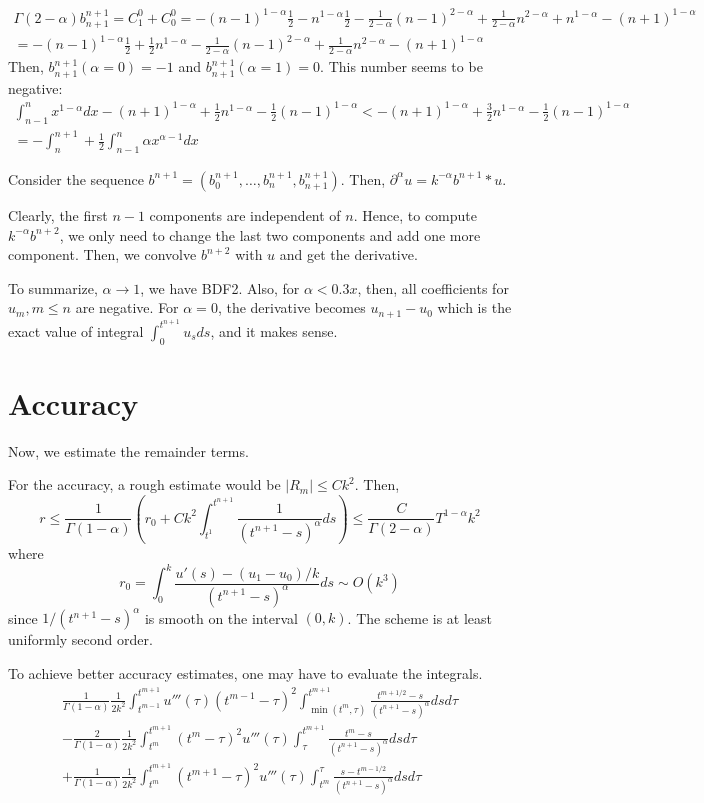 \documentclass[11pt]{article}
\begin{document}
   
\begin{multline*}
\Gamma(2-\alpha)b_{n+1}^{n+1}=C_1^0+C_0^0=
-(n-1)^{1-\alpha}\frac{1}{2}-n^{1-\alpha}\frac{1}{2}
-\frac{1}{2-\alpha}(n-1)^{2-\alpha}+\frac{1}{2-\alpha}n^{2-\alpha}
+n^{1-\alpha}-(n+1)^{1-\alpha}\\
=-(n-1)^{1-\alpha}\frac{1}{2}+\frac{1}{2}n^{1-\alpha}
-\frac{1}{2-\alpha}(n-1)^{2-\alpha}+\frac{1}{2-\alpha}n^{2-\alpha}
-(n+1)^{1-\alpha}
\end{multline*}
Then, $b_{n+1}^{n+1}(\alpha=0)=-1$ and $b_{n+1}^{n+1}(\alpha=1)=0$. This number seems to be negative: 
\begin{multline*}
\int_{n-1}^nx^{1-\alpha}dx-(n+1)^{1-\alpha}+\frac{1}{2}n^{1-\alpha}
-\frac{1}{2}(n-1)^{1-\alpha}
<-(n+1)^{1-\alpha}+\frac{3}{2}n^{1-\alpha}-\frac{1}{2}(n-1)^{1-\alpha}\\
=-\int_n^{n+1}+\frac{1}{2}\int_{n-1}^n\alpha x^{\alpha-1}dx
\end{multline*}

Consider the sequence $b^{n+1}=(b_0^{n+1}, \ldots, b_n^{n+1}, b_{n+1}^{n+1})$. Then, $\partial^{\alpha}u=k^{-\alpha}b^{n+1}*u$.

Clearly, the first $n-1$ components are independent of $n$. Hence, to compute $k^{-\alpha}b^{n+2}$, we only need to change the last two components and add one more component. Then, we convolve $b^{n+2}$ with $u$ and get the derivative.

To summarize, $\alpha\to 1$, we have BDF2. Also, for $\alpha<0.3x$, then, all coefficients for $u_m, m\le n$ are negative. 
For $\alpha=0$, the derivative becomes $u_{n+1}-u_0$ which is the exact value of integral $\int_0^{t^{n+1}}u_s ds$, and it makes sense.

\section{Accuracy}
Now, we estimate the remainder terms.

For the accuracy, a rough estimate would be $|R_m|\le Ck^2$. Then, $$
r\le \frac{1}{\Gamma(1-\alpha)}(r_0+Ck^2\int_{t^1}^{t^{n+1}}\frac{1}{(t^{n+1}-s)^{\alpha}}ds)\le \frac{C}{\Gamma(2-\alpha)}T^{1-\alpha}k^2
$$
where $$
r_0=\int_0^k\frac{u'(s)-(u_1-u_0)/k}{(t^{n+1}-s)^{\alpha}}ds
\sim 
O(k^3)
$$
since $1/(t^{n+1}-s)^{\alpha}$ is smooth on the interval $(0, k)$.
The scheme is at least uniformly second order.

To achieve better accuracy estimates, one may have to evaluate the integrals. 
\begin{multline*}
\frac{1}{\Gamma(1-\alpha)}\frac{1}{2k^2}\int_{t^{m-1}}^{t^{m+1}}
u'''(\tau)(t^{m-1}-\tau)^2\int_{\min(t^m,\tau)}^{t^{m+1}}\frac{t^{m+1/2}-s}{(t^{n+1}-s)^{\alpha}}dsd\tau\\
-\frac{2}{\Gamma(1-\alpha)}\frac{1}{2k^2}\int_{t^m}^{t^{m+1}}
(t^m-\tau)^2u'''(\tau)\int_{\tau}^{t^{m+1}}\frac{t^{m}-s}{(t^{n+1}-s)^{\alpha}}dsd\tau\\
+\frac{1}{\Gamma(1-\alpha)}\frac{1}{2k^2}\int_{t^m}^{t^{m+1}}
(t^{m+1}-\tau)^2u'''(\tau)\int_{t^m}^{\tau}\frac{s-t^{m-1/2}}{(t^{n+1}-s)^{\alpha}}dsd\tau
\end{multline*}
\end{document}
